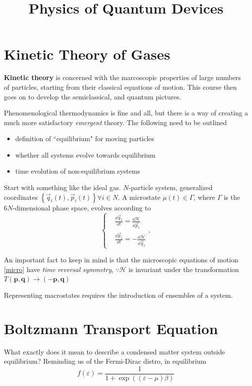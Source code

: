 \documentclass[a4paper]{article}
\title{Physics of Quantum Devices}
\date{}
\begin{document}
\maketitle
\section*{Kinetic Theory of Gases}

\textbf{Kinetic theory} is concerned with the marcoscopic properties
of large numbers of particles, starting from their classical equations
of motion. This course then goes on to develop the semiclassical, and
quantum pictures.

Phenomenological thermodynamics is fine and all, but there is a way
of creating a much more satisfactory \emph{emergent} theory. The
following need to be outlined
\begin{itemize}
	\item definition of ``equilibrium" for moving particles
	\item whether all systems evolve towards equilibrium
	\item time evolution of non-equilibrium systems
\end{itemize}

Start with something like the ideal gas. $N$-particle system, generalized
coordinates $\left\{ \vec{q}_i(t), \vec{p}_i(t) \right\} \forall i \in N$.
A microstate $\mu(t) \in \Gamma$, where $\Gamma$ is the $6N$-dimensional
phase space, evolves according to
\begin{equation} \label{micro}
	\begin{cases}
		&\frac{\dd \vec{q}_i}{\dd t} = \frac{\dd \mathcal{H}}{\dd \vec{p}_i} \\
		&\frac{\dd \vec{p}_i}{\dd t}= -\frac{\dd \mathcal{H}}{\dd \vec{q}_i}
	\end{cases},
\end{equation}

An important fact to keep in mind is that the microscopic equations
of motion \ref{micro} have \emph{time reversal symmetry}, $\because \mathcal{H}$ is invariant under the transformation $T(\mathbf{p, q}) 
\to (-\mathbf{p, q})$

Representing macrostates requires the introduction of ensembles of
a system.

\section*{Boltzmann Transport Equation}
What exactly does it mean to describe a condensed matter system
outside equilibrium? Reminding us of the Fermi-Dirac distro, in equilibrium
\begin{equation}
	f(\varepsilon) = \frac{1}{1 + \exp((\varepsilon - \mu)\beta)}
\end{equation}
\end{document}
